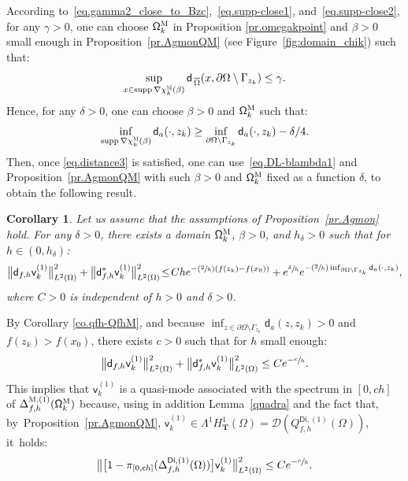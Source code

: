 \documentclass[10pt]{amsart}
\newcommand{\Psfrac}[2]{(\sfrac{#1}{#2})}
\newcommand{\mbf}[1]{\mathbf{#1}}
\DeclareMathOperator\supp{supp}
\theoremstyle{plain}
\newtheorem{corollary}[proposition]{Corollary}
\theoremstyle{definition}
\begin{document}
According to~\eqref{eq.gamma2_close_to_Bzc},~\eqref{eq.supp-close1},
and~\eqref{eq.supp-close2}, for any $\gamma>0$, one can choose
$\mathsf \Omega_k^{\textsc{M}}$ in Proposition \ref{pr.omegakpoint} and
$\beta >0$ small enough in Proposition~\ref{pr.AgmonQM} (see Figure~\ref{fig:domain_chik}) such that:
\[
\sup_{x\in \supp \nabla \chi_k^{\textsc{M}} (\beta)}\mathsf d_{\, \overline \Omega}(x, \partial \Omega \setminus \Gamma_{z_k})\le \gamma.
\]
Hence, for any $\delta>0$, one can choose $\beta >0$ and $\mathsf \Omega_k^{\textsc{M}}$ such that:
\begin{equation}\label{eq.distance3}
\inf_{ \supp \nabla \chi_k^{\textsc{M}} (\beta)} \mathsf d_a(\cdot,z_k)\ge \inf_{ \partial \Omega \setminus \Gamma_{z_k}} \mathsf d_a(\cdot,z_k)-\delta/4.
\end{equation}
Then, once \eqref{eq.distance3} is satisfied, one can
use~\eqref{eq.DL-blambda1} and Proposition~\ref{pr.AgmonQM} with such
$\beta>0$ and $\mathsf \Omega_k^{\textsc{M}}$ fixed as a function $\delta$, to obtain the following result.

\begin{corollary}\label{co.AgmonQM}
\label{co.qfh-QfhM}
Let us assume that the assumptions of Proposition~\ref{pr.Agmon} hold.
For any $\delta>0$,
there exists a domain $\mathsf \Omega_k^{\textsc{M}}$, $\beta>0$, and $h_\delta>0$ such that for $h\in (0,h_\delta)$:
\[
\big \| \mathsf d_{f,h} \mathsf v_k^{(1)} \big \|^{2}_{ L^{2} (\Omega)}+
\big \| \mathsf d^{*}_{f,h} \mathsf v_k^{(1)} \big \|^{2}_{ L^{2} (\Omega)}\!\le\! Ch e^{-\Psfrac 2h(f(z_k)-f(x_0))}+ e^{\sfrac{ \delta}{h}}e^{-\Psfrac 2h \inf_{ \partial \Omega \setminus \Gamma_{z_k}} \mathsf d_a(\cdot,z_k)},
\]
where $C>0$ is independent of $h>0$ and $\delta>0$.\end{corollary}

By Corollary \ref{co.qfh-QfhM}, and because $\inf_{z\in \partial \Omega \setminus \Gamma_{z_k}} \mathsf d_a(z,z_k)>0$ and $f(z_k)>f(x_0)$, there exists $c>0$ such that for $h$ small enough:
\[
\big \| \mathsf d_{f,h} \mathsf v_k^{(1)} \big \|^{2}_{ L^{2} (\Omega)}+
\big \| \mathsf d^{*}_{f,h} \mathsf v_k^{(1)} \big \|^{2}_{ L^{2} (\Omega)}\le C e^{-\sfrac ch}.
\]
This implies that $ \mathsf v_k^{(1)} $ is a quasi-mode
associated with the spectrum in $[0,ch]$ of
$\Delta_{f,h}^{\textsc{M},(1)} (\mathsf \Omega_k^{\textsc{M}})$
because, using in addition Lemma~\ref{quadra} and the fact that, by~Proposition~\ref{pr.AgmonQM}, $\mathsf v_k^{(1)}\in \Lambda^1H^1_{\mbf T}(\Omega)=\mathcal D(Q_{f,h}^{\mathsf{Di},(1)} (\Omega))$, it~holds:
\begin{equation}\label{eq.QM-est-expo-petit}
\bigl \Vert \big [1-\pi_{[0,\mathsf ch]} (\Delta_{f,h}^{\mathsf{Di},(1)} (\Omega))\big] \mathsf v_k^{(1)} \bigr \|^{2}_{ L^{2} (\Omega)} \le C e^{-\sfrac ch}.
\end{equation}
\end{document}
